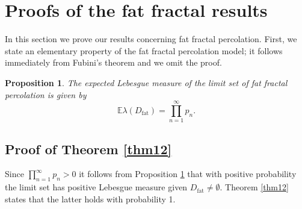 \documentclass[11pt,a4paper]{article}
\newcommand{\IE}{\ensuremath{\mathbb{E}}}
\newcommand{\Dfat}{\ensuremath{D_{\text{fat}}}}
\newtheorem{proposition}[theorem]{Proposition}
\theoremstyle{remark}
\begin{document}
\section{Proofs of the fat fractal results} \label{sec main fat}

In this section we prove our results concerning fat fractal percolation. First, we state an elementary property of the fat fractal percolation model; it follows immediately from Fubini's theorem and we omit the proof.

\begin{proposition}\label{prop expectation}
The expected Lebesgue measure of the limit set of fat fractal percolation is given by 
\[
\IE \lambda(\Dfat) = \prod_{n=1}^{\infty} p_n.
\]
\end{proposition}

\subsection{Proof of Theorem \ref{thm12}}

Since $\prod_{n=1}^{\infty} p_n >0$ it follows from Proposition \ref{prop expectation} that with positive probability the limit set has positive Lebesgue measure given $\Dfat \neq \emptyset$. Theorem \ref{thm12} states that the latter holds with probability 1.
\end{document}
